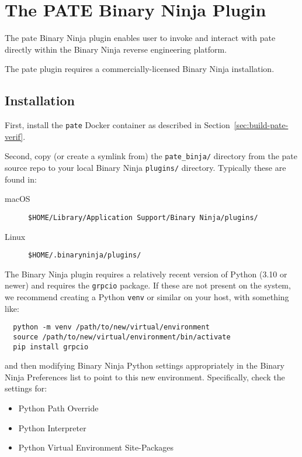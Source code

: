 \section{The PATE Binary Ninja Plugin}
\label{sec:binary-ninja-ui}

The pate Binary Ninja plugin enables user to invoke and interact with pate directly within the Binary Ninja reverse engineering platform.

The pate plugin requires a commercially-licensed Binary Ninja installation.

\subsection{Installation}

First, install the \texttt{pate} Docker container as described in Section~\ref{sec:build-pate-verif}.

Second, copy (or create a symlink from) the \texttt{pate\_binja/} directory from the pate source repo to your local Binary Ninja \texttt{plugins/} directory. Typically these are found in:
\begin{description}
\item[macOS] \texttt{\$HOME/Library/Application Support/Binary Ninja/plugins/}
\item[Linux] \texttt{\$HOME/.binaryninja/plugins/}
\end{description}

The Binary Ninja plugin requires a relatively recent version of Python (3.10 or newer) and requires the \texttt{grpcio} package.
If these are not present on the system, we recommend creating a Python \texttt{venv} or similar on your host, with something like:

\begin{verbatim}
  python -m venv /path/to/new/virtual/environment
  source /path/to/new/virtual/environment/bin/activate
  pip install grpcio
\end{verbatim}

and then modifying Binary Ninja Python settings appropriately in the Binary Ninja Preferences list to point to this new environment.
Specifically, check the settings for:

\begin{itemize}
    \item Python Path Override
    \item Python Interpreter
    \item Python Virtual Environment Site-Packages
\end{itemize}

